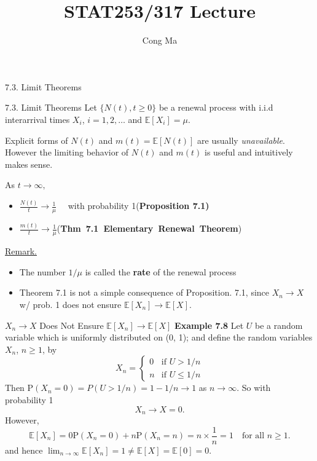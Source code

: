 \documentclass[letterpaper,handout, mathserif]{beamer}
\title{STAT253/317 Lecture \chapnum} \date{} \author{Cong Ma}
\def\p{\mathrm P}
\def\E{\mathbb E}
\begin{document}
\begin{frame}\maketitle\begin{center}7.3. Limit Theorems\end{center}\end{frame}
\begin{frame}{7.3. Limit Theorems}
Let $\{N(t),t\ge 0\}$ be a renewal process with i.i.d interarrival times $X_i$, $i=1,2,\ldots$ and $\E[X_i]=\mu$.\par\medskip

Explicit forms of $N(t)$ and $m(t)=\E[N(t)]$ are usually {\em unavailable}.
However the limiting behavior of $N(t)$ and $m(t)$ is useful and intuitively makes sense.\medskip

As $t\to \infty,$
\begin{itemize}
\item $\displaystyle\frac{N(t)}{t}\to\frac{1}{\mu}\quad$ with probability 1\hfill (\bf Proposition 7.1)
\item $\displaystyle\frac{m(t)}{t}\to\frac{1}{\mu}$\hfill (\mbox{\bf Thm 7.1\; Elementary Renewal Theorem})
\end{itemize}\bigskip

\underline{Remark.}
\begin{itemize}
\item The number $1/\mu$ is called the {\bf rate} of the renewal process
\item Theorem 7.1 is not a simple consequence of Proposition. 7.1, since $X_n\to X$ w/ prob. 1 does not ensure $\E[X_n]\to\E[X].$
\end{itemize}
\end{frame}
\begin{frame}{$X_n\to X$ Does Not Ensure $\E[X_n]\to\E[X]$}
\mbox{}{\bf Example 7.8}
Let $U$ be a random variable which is uniformly distributed on (0,
1); and define the random variables $X_n$, $n \ge 1$, by
$$
X_n =
\begin{cases}
0 &\text{if }U>1/n\\
n &\text{if }U\le 1/n
\end{cases}
$$
Then $\p(X_n=0)=P(U>1/n)=1-1/n\to 1$ as $n\to\infty.$ So with probability 1
$$X_n\to X=0.$$
However,
$$
\E[X_n]=0\p(X_n=0)+n\p(X_n=n)=n\times\frac{1}{n}=1\quad\text{for all }n\ge 1.
$$
and hence $\lim_{n\to\infty}\E[X_n]=1\neq \E[X]=\E[0]=0.$
\end{frame}
\end{document}
